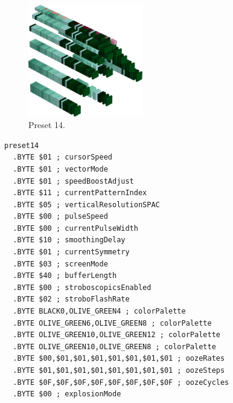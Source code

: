 \vspace*{0.5cm}
\begin{minipage}[b]{0.48\linewidth}
\begin{figure}[H]                                                          
  \centering                                                             
  \begin{adjustbox}{width=5cm,center}                                   
  \includegraphics[width=5cm]{src/colorspace_presets/preset14-45.png}%
  \end{adjustbox}                                                        
\caption*{Preset 14.}                                           
\end{figure}                                                               
\end{minipage}
\hspace{0.1cm}
\begin{minipage}[b]{0.48\linewidth}                                                                         
\begin{lstlisting}[basicstyle=\ttfamily\tiny]
preset14
  .BYTE $01 ; cursorSpeed
  .BYTE $01 ; vectorMode
  .BYTE $01 ; speedBoostAdjust
  .BYTE $11 ; currentPatternIndex
  .BYTE $05 ; verticalResolutionSPAC
  .BYTE $00 ; pulseSpeed
  .BYTE $00 ; currentPulseWidth
  .BYTE $10 ; smoothingDelay
  .BYTE $01 ; currentSymmetry
  .BYTE $03 ; screenMode
  .BYTE $40 ; bufferLength
  .BYTE $00 ; stroboscopicsEnabled
  .BYTE $02 ; stroboFlashRate
  .BYTE BLACK0,OLIVE_GREEN4 ; colorPalette
  .BYTE OLIVE_GREEN6,OLIVE_GREEN8 ; colorPalette
  .BYTE OLIVE_GREEN10,OLIVE_GREEN12 ; colorPalette
  .BYTE OLIVE_GREEN10,OLIVE_GREEN8 ; colorPalette
  .BYTE $00,$01,$01,$01,$01,$01,$01,$01 ; oozeRates
  .BYTE $01,$01,$01,$01,$01,$01,$01,$01 ; oozeSteps
  .BYTE $0F,$0F,$0F,$0F,$0F,$0F,$0F,$0F ; oozeCycles
  .BYTE $00 ; explosionMode
\end{lstlisting}
\end{minipage}


